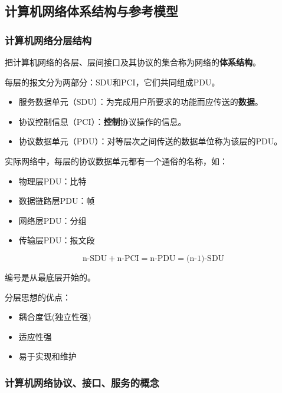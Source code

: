 \documentclass[12pt, a4paper, oneside]{ctexart}
\begin{document}
\subsection{计算机网络体系结构与参考模型}

\subsubsection{计算机网络分层结构}

把计算机网络的各层、层间接口及其协议的集合称为网络的\textbf{体系结构}。

每层的报文分为两部分：SDU和PCI，它们共同组成PDU。
\begin{itemize}
    \item 服务数据单元（SDU）：为完成用户所要求的功能而应传送的\textbf{数据}。
    \item 协议控制信息（PCI）：\textbf{控制}协议操作的信息。
    \item 协议数据单元（PDU）：对等层次之间传送的数据单位称为该层的PDU。
\end{itemize}
实际网络中，每层的协议数据单元都有一个通俗的名称，如：
\begin{itemize}
    \item 物理层PDU：比特
    \item 数据链路层PDU：帧
    \item 网络层PDU：分组
    \item 传输层PDU：报文段
\end{itemize}
\begin{equation*}
    \text{n-SDU}+\text{n-PCI}=\text{n-PDU}=\text{(n-1)-SDU}
\end{equation*}

编号是从最底层开始的。

分层思想的优点：
\begin{itemize}
    \item 耦合度低(独立性强)
    \item 适应性强
    \item 易于实现和维护
\end{itemize}

\subsubsection{计算机网络协议、接口、服务的概念}
\end{document}
